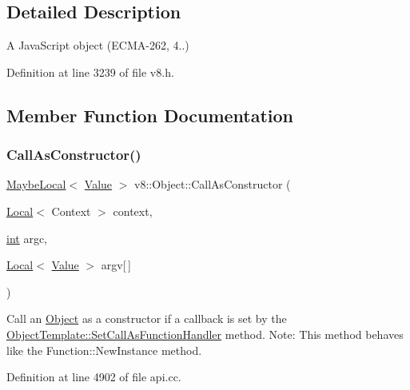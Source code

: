 \subsection{Detailed Description}
A Java\+Script object (E\+C\+M\+A-\/262, 4..) 

Definition at line 3239 of file v8.\+h.



\subsection{Member Function Documentation}
\mbox{\label{classv8_1_1Object_a64254f08a94bf19c91513875e9dc80e7}} 
\subsubsection{\texorpdfstring{Call\+As\+Constructor()}{CallAsConstructor()}}
{\footnotesize\ttfamily \mbox{\hyperlink{classv8_1_1MaybeLocal}{Maybe\+Local}}$<$ \mbox{\hyperlink{classv8_1_1Value}{Value}} $>$ v8\+::\+Object\+::\+Call\+As\+Constructor (\begin{DoxyParamCaption}\item[{\mbox{\hyperlink{classv8_1_1Local}{Local}}$<$ Context $>$}]{context,  }\item[{\mbox{\hyperlink{classint}{int}}}]{argc,  }\item[{\mbox{\hyperlink{classv8_1_1Local}{Local}}$<$ \mbox{\hyperlink{classv8_1_1Value}{Value}} $>$}]{argv\mbox{[}$\,$\mbox{]} }\end{DoxyParamCaption})}

Call an \mbox{\hyperlink{classv8_1_1Object}{Object}} as a constructor if a callback is set by the \mbox{\hyperlink{classv8_1_1ObjectTemplate_a1775c8f73e643c339804d2f5b628eddf}{Object\+Template\+::\+Set\+Call\+As\+Function\+Handler}} method. Note\+: This method behaves like the Function\+::\+New\+Instance method. 

Definition at line 4902 of file api.\+cc.

\mbox{\label{classv8_1_1Object_a36ee3ee43ef630b0348d11f63e717d9a}} 
